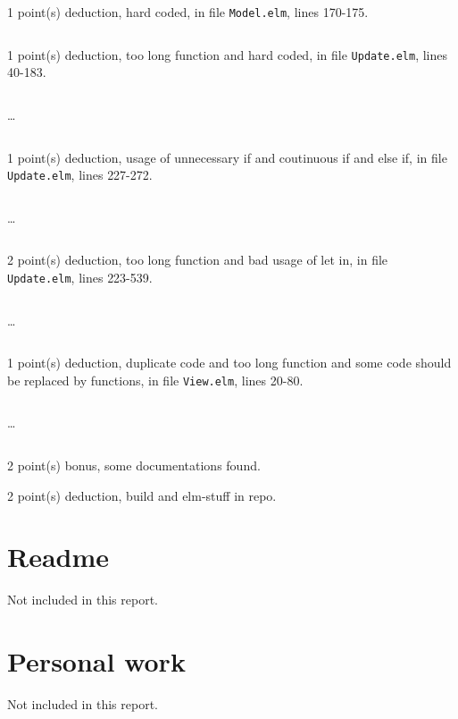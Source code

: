 \documentclass{article}
\begin{document}
1 point(s) {\color{red}deduction}, hard coded, in file {\color{blue}\texttt{Model.elm}}, lines {\color{blue}170-175}.

\inputminted[firstline=170,lastline=175]{elm}{Model.elm}

1 point(s) {\color{red}deduction}, too long function and hard coded, in file {\color{blue}\texttt{Update.elm}}, lines {\color{blue}40-183}.

\inputminted[firstline=40,lastline=49]{elm}{Update.elm}

\dots

\inputminted[firstline=174,lastline=183]{elm}{Update.elm}

1 point(s) {\color{red}deduction}, usage of unnecessary if and coutinuous if and else if, in file {\color{blue}\texttt{Update.elm}}, lines {\color{blue}227-272}.

\inputminted[firstline=227,lastline=236]{elm}{Update.elm}

\dots

\inputminted[firstline=263,lastline=272]{elm}{Update.elm}

2 point(s) {\color{red}deduction}, too long function and bad usage of let in, in file {\color{blue}\texttt{Update.elm}}, lines {\color{blue}223-539}.

\inputminted[firstline=223,lastline=232]{elm}{Update.elm}

\dots

\inputminted[firstline=530,lastline=539]{elm}{Update.elm}

1 point(s) {\color{red}deduction}, duplicate code and too long function and some code should be replaced by functions, in file {\color{blue}\texttt{View.elm}}, lines {\color{blue}20-80}.

\inputminted[firstline=20,lastline=29]{elm}{View.elm}

\dots

\inputminted[firstline=71,lastline=80]{elm}{View.elm}

2 point(s) {\color{red}bonus}, some documentations found.\medskip

2 point(s) {\color{red}deduction}, build and elm-stuff in repo.\medskip



\newpage

\section{Readme}

Not included in this report.

\section{Personal work}

Not included in this report.


\newpage
\end{document}
